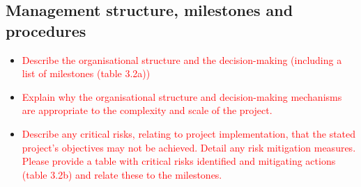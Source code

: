 \documentclass[11pt, a4paper]{article} %
\begin{document}

\subsection{Management structure, milestones and procedures}

\begin{itemize}
  \item \textcolor{red}{Describe the organisational structure and the
      decision-making (including a list of milestones (table 3.2a))}
\item \textcolor{red}{Explain why the organisational structure and
  decision-making mechanisms are appropriate to the complexity and
  scale of the project.}
\item \textcolor{red}{Describe any critical risks, relating to project
    implementation, that the stated project's objectives may not be
    achieved. Detail any risk mitigation measures. Please provide a
    table with critical risks identified and mitigating actions (table
    3.2b) and relate these to the milestones.}
\end{itemize}
\end{document}
